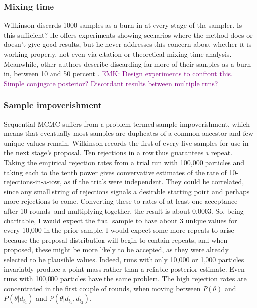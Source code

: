 \documentclass{article}
\newcommand\EMK[1]{\textcolor{purple}{EMK: #1}}
\begin{document}
\subsubsection{Mixing time}
Wilkinson discards 1000 samples as a burn-in at every stage of the sampler. Is this sufficient? He offers experiments showing scenarios where the method does or doesn't give good results, but he never addresses this concern about whether it is working properly, not even via citation or theoretical mixing time analysis. Meanwhile, other authors describe discarding far more of their samples as a burn-in, between 10 and 50 percent \cite{gupta2014comparison,zechner2014scalable}.  \EMK{Design experiments to confront this. Simple conjugate posterior? Discordant results between multiple runs?}

\subsubsection{Sample impoverishment}
Sequential MCMC suffers from a problem termed sample impoverishment, which means that eventually most samples are duplicates of a common ancestor and few unique values remain. Wilkinson records the first of every five samples for use in the next stage's proposal. Ten rejections in a row thus guarantees a repeat. %
Taking the empirical rejection rates from a trial run with 100,000 particles and taking each to the tenth power gives convervative estimates of the rate of 10-rejections-in-a-row, as if the trials were independent. They could be correlated, since any small string of rejections signals a desirable starting point and perhaps more rejections to come. Converting these to rates of at-least-one-acceptance-after-10-rounds, and multiplying together, the result is about 0.0003. So, being charitable, I would expect the final sample to have about 3 unique values for every 10,000 in the prior sample.
I would expect some more repeats to arise because the proposal distribution will begin to contain repeats, and when proposed, these might be more likely to be accepted, as they were already selected to be plausible values. Indeed, runs with only 10,000 or 1,000 particles invariably produce a point-mass rather than a reliable posterior estimate. Even runs with 100,000 particles have the same problem. The high rejection rates are concentrated in the first couple of rounds, when moving between $P(\theta)$ and $P(\theta|d_{t_1})$ and $P(\theta|d_{t_1}, d_{t_2})$. 
\end{document}
